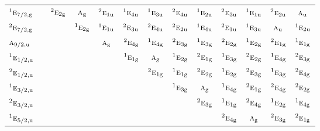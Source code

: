 \documentclass[10pt,a4paper]{article}
\numberwithin{equation}{section}
\newcommand{\irr}[1]{\text{\normalfont\scshape #1}}
\newcommand{\conjpair}[1]{{}^{#1}}
\newcommand{\ptag}[1]{\mathrm{#1}}
\begin{document}
{\begin{longtable}{@{}lcccccccccccc@{}}
$\conjpair{1}\irr{e}_{7/2,\ptag{g}}$ &  & $\conjpair{2}\irr{e}_{2\ptag{g}}$ & $\irr{a}_{\ptag{g}}$ & $\conjpair{2}\irr{e}_{1\ptag{u}}$ & $\conjpair{1}\irr{e}_{4\ptag{u}}$ & $\conjpair{1}\irr{e}_{3\ptag{u}}$ & $\conjpair{2}\irr{e}_{4\ptag{u}}$ & $\conjpair{1}\irr{e}_{2\ptag{u}}$ & $\conjpair{2}\irr{e}_{3\ptag{u}}$ & $\conjpair{1}\irr{e}_{1\ptag{u}}$ & $\conjpair{2}\irr{e}_{2\ptag{u}}$ & $\irr{a}_{\ptag{u}}$\\
$\conjpair{2}\irr{e}_{7/2,\ptag{g}}$ &  &  & $\conjpair{1}\irr{e}_{2\ptag{g}}$ & $\conjpair{1}\irr{e}_{1\ptag{u}}$ & $\conjpair{2}\irr{e}_{3\ptag{u}}$ & $\conjpair{2}\irr{e}_{4\ptag{u}}$ & $\conjpair{2}\irr{e}_{2\ptag{u}}$ & $\conjpair{1}\irr{e}_{4\ptag{u}}$ & $\conjpair{2}\irr{e}_{1\ptag{u}}$ & $\conjpair{1}\irr{e}_{3\ptag{u}}$ & $\irr{a}_{\ptag{u}}$ & $\conjpair{1}\irr{e}_{2\ptag{u}}$\\
$\irr{a}_{9/2,\ptag{u}}$ &  &  &  & $\irr{a}_{\ptag{g}}$ & $\conjpair{2}\irr{e}_{4\ptag{g}}$ & $\conjpair{1}\irr{e}_{4\ptag{g}}$ & $\conjpair{2}\irr{e}_{3\ptag{g}}$ & $\conjpair{1}\irr{e}_{3\ptag{g}}$ & $\conjpair{2}\irr{e}_{2\ptag{g}}$ & $\conjpair{1}\irr{e}_{2\ptag{g}}$ & $\conjpair{2}\irr{e}_{1\ptag{g}}$ & $\conjpair{1}\irr{e}_{1\ptag{g}}$\\
$\conjpair{1}\irr{e}_{1/2,\ptag{u}}$ &  &  &  &  & $\conjpair{1}\irr{e}_{1\ptag{g}}$ & $\irr{a}_{\ptag{g}}$ & $\conjpair{1}\irr{e}_{2\ptag{g}}$ & $\conjpair{2}\irr{e}_{1\ptag{g}}$ & $\conjpair{1}\irr{e}_{3\ptag{g}}$ & $\conjpair{2}\irr{e}_{2\ptag{g}}$ & $\conjpair{1}\irr{e}_{4\ptag{g}}$ & $\conjpair{2}\irr{e}_{3\ptag{g}}$\\
$\conjpair{2}\irr{e}_{1/2,\ptag{u}}$ &  &  &  &  &  & $\conjpair{2}\irr{e}_{1\ptag{g}}$ & $\conjpair{1}\irr{e}_{1\ptag{g}}$ & $\conjpair{2}\irr{e}_{2\ptag{g}}$ & $\conjpair{1}\irr{e}_{2\ptag{g}}$ & $\conjpair{2}\irr{e}_{3\ptag{g}}$ & $\conjpair{1}\irr{e}_{3\ptag{g}}$ & $\conjpair{2}\irr{e}_{4\ptag{g}}$\\
$\conjpair{1}\irr{e}_{3/2,\ptag{u}}$ &  &  &  &  &  &  & $\conjpair{1}\irr{e}_{3\ptag{g}}$ & $\irr{a}_{\ptag{g}}$ & $\conjpair{1}\irr{e}_{4\ptag{g}}$ & $\conjpair{2}\irr{e}_{1\ptag{g}}$ & $\conjpair{2}\irr{e}_{4\ptag{g}}$ & $\conjpair{2}\irr{e}_{2\ptag{g}}$\\
$\conjpair{2}\irr{e}_{3/2,\ptag{u}}$ &  &  &  &  &  &  &  & $\conjpair{2}\irr{e}_{3\ptag{g}}$ & $\conjpair{1}\irr{e}_{1\ptag{g}}$ & $\conjpair{2}\irr{e}_{4\ptag{g}}$ & $\conjpair{1}\irr{e}_{2\ptag{g}}$ & $\conjpair{1}\irr{e}_{4\ptag{g}}$\\
$\conjpair{1}\irr{e}_{5/2,\ptag{u}}$ &  &  &  &  &  &  &  &  & $\conjpair{2}\irr{e}_{4\ptag{g}}$ & $\irr{a}_{\ptag{g}}$ & $\conjpair{2}\irr{e}_{3\ptag{g}}$ & $\conjpair{2}\irr{e}_{1\ptag{g}}$\\

\end{longtable}}
\end{document}
